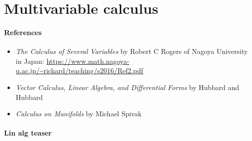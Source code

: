 \part*{Multivariable calculus}

\subsection*{References}

\begin{itemize}
    \item \textit{The Calculus of Several Variables} by Robert C Rogers of Nagoya University in Japan: \url{https://www.math.nagoya-u.ac.jp/~richard/teaching/s2016/Ref2.pdf}
    \item \textit{Vector Calculus, Linear Algebra, and Differential Forms} by Hubbard and Hubbard
    \item \textit{Calculus on Manifolds} by Michael Spivak
\end{itemize}

\subsection*{Lin alg teaser}

